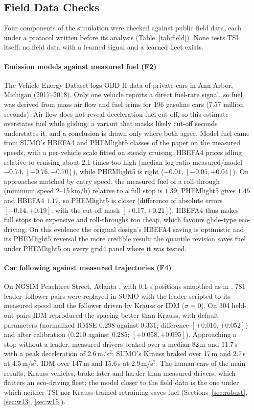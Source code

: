 \subsection{Field Data Checks}\label{sec:field}
Four components of the simulation were checked against public field data, each under a protocol written before its analysis
(Table~\ref{tab:field}). None tests TSI itself: no field data with a learned signal and a learned fleet exists.
\paragraph{Emission models against measured fuel (F2)} The Vehicle Energy Dataset \cite{oh2020ved} logs OBD-II data of private cars in Ann
Arbor, Michigan (2017--2018). Only one vehicle reports a direct fuel-rate signal, so fuel was derived from mass air flow and fuel trims
for 196 gasoline cars (7.57 million seconds). Air flow does not reveal deceleration fuel cut-off, so this estimate overstates fuel while
gliding; a variant that masks likely cut-off seconds understates it, and a conclusion is drawn only where both agree. Model fuel came
from SUMO's HBEFA4 and PHEMlight5 classes of the paper on the measured speeds, with a per-vehicle scale fitted on steady cruising.
HBEFA4 prices idling relative to cruising about 2.1 times too high (median log ratio measured/model $-0.74$, $[-0.76,-0.70]$), while
PHEMlight5 is right ($-0.01$, $[-0.05,+0.04]$). On approaches matched by entry speed, the measured fuel of a roll-through (minimum speed
2--15\,km/h) relative to a full stop is $1.39$; PHEMlight5 gives $1.45$ and HBEFA4 $1.17$, so PHEMlight5 is closer (difference of absolute
errors $[+0.14,+0.19]$; with the cut-off mask $[+0.17,+0.21]$). HBEFA4 thus makes full stops too expensive and roll-throughs too cheap, which
favours glide-type eco-driving. On this evidence the original design's HBEFA4 saving is optimistic and its PHEMlight5 reversal the more
credible result; the quantile revision saves fuel under PHEMlight5 on every grid4 panel where it was tested.
\paragraph{Car following against measured trajectories (F4)} On NGSIM Peachtree Street, Atlanta \cite{ngsim}, with 0.1-s positions
smoothed as in \cite{thiemann2008}, 781 leader--follower pairs were replayed in SUMO with the leader scripted to its measured speed and the
follower driven by Krauss or IDM ($\sigma=0$). On 304 held-out pairs IDM reproduced the spacing better than Krauss, with default parameters
(normalized RMSE $0.298$ against $0.331$; difference $[+0.016,+0.052]$) and after calibration ($0.210$ against $0.285$; $[+0.058,+0.095]$).
Approaching a stop without a leader, measured drivers braked over a median 82\,m and 11.7\,s with a peak deceleration of 2.6\,m/s$^2$;
SUMO's Krauss braked over 17\,m and 2.7\,s at 4.5\,m/s$^2$, IDM over 147\,m and 15.6\,s at 2.9\,m/s$^2$. The human cars of the main
results, Krauss vehicles, brake later and harder than measured drivers, which flatters an eco-driving fleet; the model closer to the
field data is the one under which neither TSI nor Krauss-trained retraining saves fuel (Sections~\ref{sec:robust}, \ref{sec:w13},
\ref{sec:w15}).
